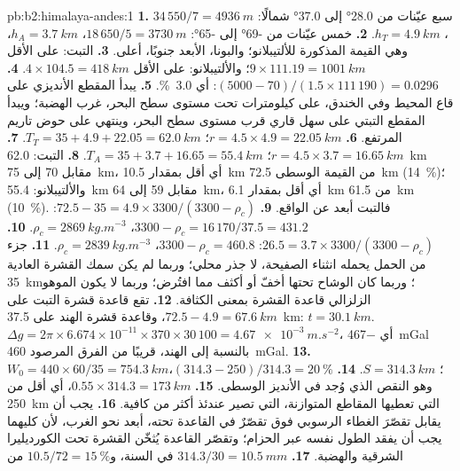 \begin{solution}{pb:b2:himalaya-andes:1}
\textbf{1.} سبع عيّنات من \ang{28.0} إلى \ang{37.0} شمالًا: $34\,550/7 = \qty{4936}{m}$، $h_T
= \qty{4.9}{km}$.
\textbf{2.} خمس عيّنات من \ang{-69} إلى \ang{-65}: $18\,650/5 = \qty{3730}{m}$، $h_A =
\qty{3.7}{km}$، وهي القيمة المذكورة للألتيبلانو؛ والبونا، الأبعد جنوبًا، أعلى.
\textbf{3.} التبت: على الأقل $9\times111.19 = \qty{1001}{km}$؛ والألتيبلانو: على الأقل $4\times
104.5 = \qty{418}{km}$.
\textbf{4.} $(5000 - 70)/(1.5\times111\,190) = 0.0296$: أي \qty{3.0}{\percent}.
\textbf{5.} يبدأ المقطع الأنديزي على قاع المحيط وفي الخندق، على كيلومترات تحت
مستوى سطح البحر، غرب الهضبة؛ ويبدأ المقطع التبتي على سهل قاري قرب مستوى سطح البحر،
وينتهي على حوض تاريم المرتفع.
\textbf{6.} $r = 4.5\times4.9 = \qty{22.05}{km}$؛ $T_T = 35 + 4.9 + 22.05 = \qty{62.0}{km}$.
\textbf{7.} $r = 4.5\times3.7 = \qty{16.65}{km}$؛ $T_A = 35 + 3.7 + 16.65 = \qty{55.4}{km}$.
\textbf{8.} التبت: \qty{62.0}{km} مقابل 70 إلى \qty{75}{km}، أي أقل بمقدار \qty{10.5}{km} من القيمة
الوسطى \qty{72.5}{km} (\qty{14}{\percent})؛ والألتيبلانو: \qty{55.4}{km} مقابل 59 إلى
\qty{64}{km}، أي أقل بمقدار \qty{6.1}{km} من \qty{61.5}{km} (\qty{10}{\percent}). فالتبت أبعد عن الواقع.
\textbf{9.} $72.5 - 35 = 4.9\times3300/(3300 - \rho_c)$: $3300 - \rho_c = 16\,170/37.5 =
431.2$، $\rho_c = \qty{2869}{kg.m^{-3}}$.
\textbf{10.} $26.5 = 3.7\times3300/(3300 - \rho_c)$: $3300 - \rho_c = 460.8$، $\rho_c =
\qty{2839}{kg.m^{-3}}$.
\textbf{11.} جزء من الحمل يحمله انثناء الصفيحة، لا جذر محلي؛ وربما لم يكن
سمك القشرة العادية \qty{35}{km}؛ وربما كان الوشاح تحتها أخفّ أو أكثف
مما افتُرض؛ وربما لا يكون الموهو الزلزالي قاعدة القشرة بمعنى الكثافة.
\textbf{12.} تقع قاعدة قشرة التبت على $72.5 - 4.9 = \qty{67.6}{km}$، وقاعدة قشرة الهند على
\qty{37.5}{km}: $t = \qty{30.1}{km}$. $\Delta g = 2\pi\times6.674\times10^{-11}\times370\times
30\,100 = \qty{4.67e-3}{m.s^{-2}}$، أي \qty{-467}{mGal} بالنسبة إلى الهند، قريبًا من
الفرق المرصود \qty{460}{mGal}.
\textbf{13.} $W_0 = 440\times60/35 = \qty{754.3}{km}$؛ $S = \qty{314.3}{km}$.
\textbf{14.} $(314.3 - 250)/314.3 = \qty{20}{\percent}$، وهو النقص الذي وُجد في الأنديز
الوسطى.
\textbf{15.} $0.55\times314.3 = \qty{173}{km}$، أي أقل من \qty{250}{km} التي تعطيها المقاطع
المتوازنة، التي تصير عندئذ أكثر من كافية.
\textbf{16.} يجب أن يقابل تقصّرَ الغطاء الرسوبي فوق  تقصّرٌ في
القاعدة تحته، أبعد نحو الغرب، لأن كليهما يجب أن يفقد الطول نفسه عبر الحزام؛ وتقصّر
القاعدة يُثخّن القشرة تحت الكورديليرا الشرقية والهضبة.
\textbf{17.} $314.3/30 = \qty{10.5}{mm}$ في السنة، و$10.5/72 = \qty{15}{\percent}$ من

\end{solution}
